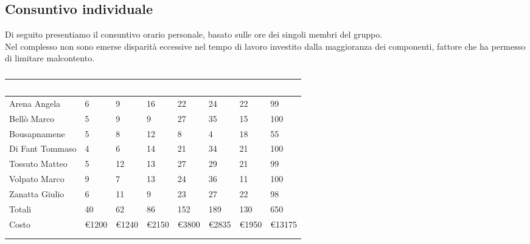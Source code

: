     \subsection{Consuntivo individuale} 
    Di seguito presentiamo il consuntivo orario personale, basato sulle ore dei singoli membri
    del gruppo. \\
    Nel complesso non sono emerse disparità eccessive nel tempo di lavoro investito dalla maggioranza
    dei componenti, fattore che ha permesso di limitare malcontento.
    {
        \setlength{\freewidth}{\dimexpr\textwidth-30\tabcolsep}
            \renewcommand{\arraystretch}{1.0}
            \setlength{\aboverulesep}{0pt}
            \setlength{\belowrulesep}{0pt}
            \begin{longtable}{C{.4\freewidth} C{.11\freewidth} C{.11\freewidth} C{.11\freewidth} C{.11\freewidth} C{.11\freewidth} C{.11\freewidth} C{.15\freewidth}}
            \toprule
            \textcolor{white}{\textbf{Componente}}&
            \textcolor{white}{\textbf{Re}}&
            \textcolor{white}{\textbf{Am}}&
            \textcolor{white}{\textbf{An}}&
            \textcolor{white}{\textbf{Pt}}&
            \textcolor{white}{\textbf{Pr}}&
            \textcolor{white}{\textbf{Ve}}&
            \textcolor{white}{\textbf{Totale}} \\
        
            \toprule
            \endhead
    
            Arena Angela & 6 & 9 & 16 & 22 & 24 & 22 & 99\\      
            Bellò Marco & 5 & 9 & 9 & 27 & 35 & 15 & 100\\      
            Bousapnamene & 5 & 8 & 12 & 8 & 4 & 18 & 55\\      
            Di Fant Tommaso & 4 & 6 & 14 & 21 & 34 & 21 & 100\\      
            Tossuto Matteo & 5 & 12 & 13 & 27 & 29 & 21 & 99 \\      
            Volpato Marco & 9 & 7 & 13 & 24 & 36 & 11 &  100 \\      
            Zanatta Giulio & 6 & 11 & 9 & 23 & 27 & 22 & 98 \\      
            Totali & 40 & 62 & 86 & 152 & 189 & 130 & 650 \\
            Costo & \euro1200 & \euro1240 & \euro2150 & \euro3800 & \euro2835 & \euro1950 &  \euro13175 \\
            \bottomrule
            \\
            \caption{}

            \end{longtable}
    }
